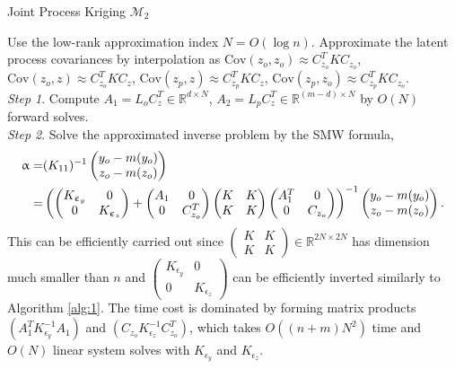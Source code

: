 \documentclass[article,ij4uq]{ij4uq}              %
\begin{document}
\begin{algorithm}[!t]
\caption{Joint Process Kriging $\mathcal{M}_{2}$}\label{alg:2}
Use the low-rank approximation index $N=O(\log{n})$. Approximate the latent process covariances by interpolation as $\mathrm{Cov}(z_{o},z_{o}) \approx C_{z_{o}}^{T}KC_{z_{o}}$, $\mathrm{Cov}(z_{o},z) \approx C_{z_{o}}^{T}KC_{z}$, $\mathrm{Cov}(z_{p},z) \approx C_{z_{p}}^{T}KC_{z}$, $\mathrm{Cov}(z_{p},z_{o}) \approx C_{z_{p}}^{T}KC_{z_{o}}$.\\
\textit{Step 1}. Compute $A_{1}=L_{o}C_{z}^{T}\in\mathbb{R}^{d\times N}$, $A_{2}=L_{p}C_{z}^{T}\in\mathbb{R}^{(m-d)\times N}$ by $O(N)$ forward solves.\\
\textit{Step 2}. Solve the approximated inverse problem by the SMW formula,
\begin{align}
    \alpha=&(K_{11})^{-1}\begin{pmatrix}y_{o}-m(y_{o})\\z_{o}-m(z_{o})\end{pmatrix}\notag\\
    =&\left(\begin{pmatrix}K_{\epsilon_{y}}&0\\0&K_{\epsilon_{z}}\end{pmatrix}+\begin{pmatrix}A_{1}&0\\0&C_{z_{o}}^{T}\end{pmatrix}\begin{pmatrix}K&K\\K&K\end{pmatrix}\begin{pmatrix}A_{1}^{T}&0\\0&C_{z_{o}}\end{pmatrix}\right)^{-1}\begin{pmatrix}y_{o}-m(y_{o})\\z_{o}-m(z_{o})\end{pmatrix}.\label{eq27}
\end{align}
This can be efficiently carried out since $\begin{pmatrix}K&K\\K&K\end{pmatrix}\in\mathbb{R}^{2N\times 2N}$ has dimension much smaller than $n$ and $\begin{pmatrix}K_{\epsilon_{y}}&0\\0&K_{\epsilon_{z}}\end{pmatrix}$ can be efficiently inverted similarly to Algorithm \ref{alg:1}. The time cost is dominated by forming matrix products $(A_{1}^{T}K_{\epsilon_{y}}^{-1}A_{1})$ and $(C_{z_{o}}K_{\epsilon_{z}}^{-1}C_{z_{o}}^{T})$, which takes $O((n+m)N^{2})$ time and $O(N)$ linear system solves with $K_{\epsilon_{y}}$ and $K_{\epsilon_{z}}$.\\


\end{algorithm}
\end{document}
